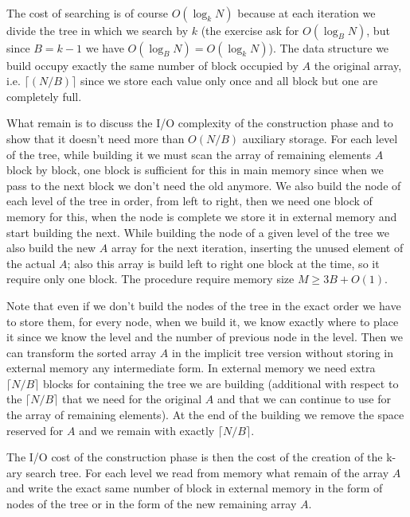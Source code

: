 \documentclass[a4paper]{article}
\newcommand\ceil[1]{\lceil#1\rceil}
\begin{document}
\


The cost of searching is of course $O(\log_{k} N)$ because at each iteration we divide the tree in which we search by $k$ (the exercise ask for $O(\log_{B} N)$, but since $B = k -1$ we have $O(\log_{B} N) = O(\log_{k} N)$).
The data structure we build occupy exactly the same number of block occupied by $A$ the original array, i.e. $\ceil{(N/B)}$ since we store each value only once and all block but one are completely full.

What remain is to discuss the I/O complexity of the construction phase and to show that it doesn't need more than $O(N/B)$ auxiliary storage.
For each level of the tree, while building it we must scan the array of remaining elements $A$ block by block, one block is sufficient for this in main memory since when we pass to the next block we don't need the old anymore.
We also build the node of each level of the tree in order, from left to right, then we need one block of memory for this, when the node is complete we store it in external memory and start building the next.
While building the node of a given level of the tree we also build the new $A$ array for the next iteration, inserting the unused element of the actual $A$; also this array is build left to right one block at the time, so it require only one block.
The procedure require memory size $M \geq 3B + O(1)$.

Note that even if we don't build the nodes of the tree in the exact order we have to store them, for every node, when we build it, we know exactly where to place it since we know the level and the number of previous node in the level.
Then we can transform the sorted array $A$ in the implicit tree version without storing in external memory any intermediate form.
In external memory we need extra $\ceil{N/B}$ blocks for containing the tree we are building (additional with respect to the $\ceil{N/B}$ that we need for the original $A$ and that we can continue to use for the array of remaining elements).
At the end of the building we remove the space reserved for $A$ and we remain with exactly $\ceil{N/B}$.


The I/O cost of the construction phase is then the cost of the creation of the k-ary search tree.
For each level we read from memory what remain of the array $A$ and write the exact same number of block in external memory in the form of nodes of the tree or in the form of the new remaining array $A$.
\end{document}
